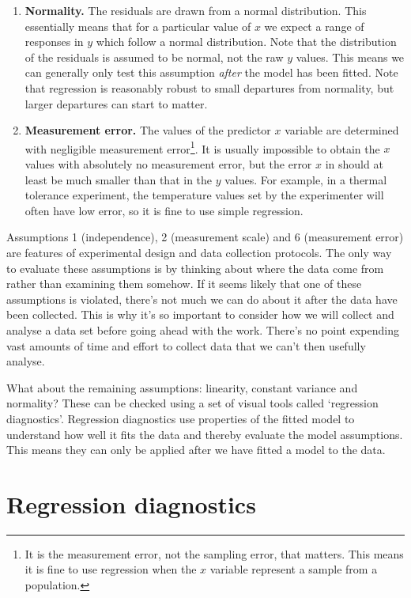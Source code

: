 \documentclass[
]{book}
\begin{document}
\begin{enumerate}
\item
  \textbf{Normality.} The residuals are drawn from a normal distribution. This essentially means that for a particular value of \(x\) we expect a range of responses in \(y\) which follow a normal distribution. Note that the distribution of the residuals is assumed to be normal, not the raw \(y\) values. This means we can generally only test this assumption \emph{after} the model has been fitted. Note that regression is reasonably robust to small departures from normality, but larger departures can start to matter.
\item
  \textbf{Measurement error.} The values of the predictor \(x\) variable are determined with negligible measurement error\footnote{It is the measurement error, not the sampling error, that matters. This means it is fine to use regression when the \(x\) variable represent a sample from a population.}. It is usually impossible to obtain the \(x\) values with absolutely no measurement error, but the error \(x\) in should at least be much smaller than that in the \(y\) values. For example, in a thermal tolerance experiment, the temperature values set by the experimenter will often have low error, so it is fine to use simple regression.
\end{enumerate}

Assumptions 1 (independence), 2 (measurement scale) and 6 (measurement error) are features of experimental design and data collection protocols. The only way to evaluate these assumptions is by thinking about where the data come from rather than examining them somehow. If it seems likely that one of these assumptions is violated, there's not much we can do about it after the data have been collected. This is why it's so important to consider how we will collect and analyse a data set before going ahead with the work. There's no point expending vast amounts of time and effort to collect data that we can't then usefully analyse.

What about the remaining assumptions: linearity, constant variance and normality? These can be checked using a set of visual tools called `regression diagnostics'. Regression diagnostics use properties of the fitted model to understand how well it fits the data and thereby evaluate the model assumptions. This means they can only be applied after we have fitted a model to the data.

\hypertarget{regres-diagnose}{%
\section{Regression diagnostics}\label{regres-diagnose}}
\end{document}
